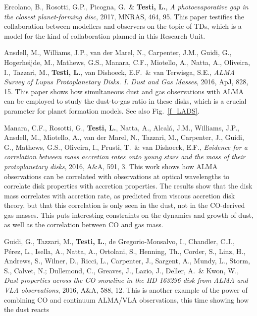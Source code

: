 \documentclass[10pt,fleqn,twoside]{article}
\begin{document}
\begin{literature}
\item Ercolano, B., Rosotti, G.P., Picogna, G.\ \& {\bf Testi, L.}, {\em A
    photoevaporative gap in the closest planet-forming disc}, 2017, MNRAS,
  464, 95. This paper testifies the collaboration between modellers and
  observers on the topic of TDs, which is a model for the kind of
  collaboration planned in this Research Unit.
\item Ansdell, M., Williams, J.P., van der Marel, N., Carpenter, J.M.,
  Guidi, G., Hogerheijde, M., Mathews, G.S., Manara, C.F., Miotello, A.,
  Natta, A., Oliveira, I., Tazzari, M., {\bf Testi, L.}, van Dishoeck, E.F.\
  \& van Terwisga, S.E., {\em ALMA Survey of Lupus Protoplanetary
    Disks. I. Dust and Gas Masses}, 2016, ApJ, 828, 15. This paper shows how
  simultaneous dust and gas observations with ALMA can be employed to study
  the dust-to-gas ratio in these disks, which is a crucial parameter for
  planet formation models. See also Fig.~\ref{f_LADS}.
\item Manara, C.F., Rosotti, G., {\bf Testi, L.}, Natta, A., Alcalá, J.M.,
  Williams, J.P., Ansdell, M., Miotello, A., van der Marel, N., Tazzari, M.,
  Carpenter, J., Guidi, G., Mathews, G.S., Oliveira, I., Prusti, T.\ \& van
  Dishoeck, E.F., {\em Evidence for a correlation between mass accretion
    rates onto young stars and the mass of their protoplanetary disks},
  2016, A\&A, 591, 3. This work shows how ALMA observations can be
  correlated with observations at optical wavelengths to correlate disk
  properties with accretion properties. The results show that the disk mass
  correlates with accretion rate, as predicted from viscous accretion disk
  theory, but that this correlation is only seen in the dust, not in the
  CO-derived gas masses.  This puts interesting constraints on the dynamics
  and growth of dust, as well as the correlation between CO and gas mass.
\item Guidi, G., Tazzari, M., {\bf Testi, L.}, de Gregorio-Monsalvo, I.,
  Chandler, C.J., Pérez, L., Isella, A., Natta, A., Ortolani, S., Henning,
  Th., Corder, S., Linz, H., Andrews, S., Wilner, D., Ricci, L., Carpenter,
  J., Sargent, A., Mundy, L., Storm, S., Calvet, N.; Dullemond, C., Greaves,
  J., Lazio, J., Deller, A.\ \& Kwon, W., {\em Dust properties across the CO
    snowline in the HD 163296 disk from ALMA and VLA observations}, 2016,
  A\&A, 588, 12. This is another example of the power of combining CO and
  continuum ALMA/VLA observations, this time showing how the dust reacts

\end{literature}
\end{document}

